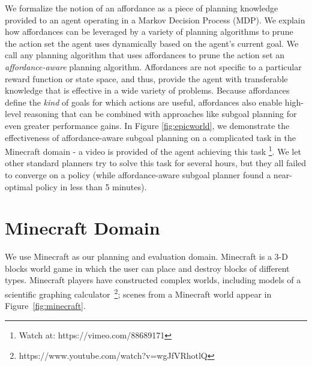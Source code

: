\documentclass[]{article}
\begin{document}
      We formalize the notion of an affordance as a piece of planning
      knowledge provided to an agent operating in a Markov Decision
      Process (MDP). We explain how affordances can be leveraged by a
      variety of planning algorithms to prune the action set the agent
      uses dynamically based on the agent's current goal.  We call any
      planning algorithm that uses affordances to prune the action set
      an {\it affordance-aware} planning algorithm.  Affordances are
      not specific to a particular reward function or state space, and thus,
      provide the agent with transferable knowledge that is effective
      in a wide variety of problems. Because affordances
      define the {\em kind} of goals for which actions are useful,
      affordances also enable high-level reasoning that can
      be combined with approaches like subgoal planning for even
      greater performance gains. In Figure \ref{fig:epicworld}, we demonstrate the effectiveness of
      affordance-aware subgoal planning on a complicated task
      in the Minecraft domain - a video is provided of the agent achieving this task \footnote{Watch at: https://vimeo.com/88689171}.
      We let other standard planners try to solve this task for several hours, but they all failed
      to converge on a policy (while affordance-aware subgoal planner found a near-optimal
      policy in less than 5 minutes).





\section{Minecraft Domain}
We use Minecraft as our planning and evaluation domain. Minecraft is a
3-D blocks world game in which the user can place and destroy blocks
of different types.  Minecraft players have constructed complex
worlds, including models of a scientific graphing
calculator~\footnote{https://www.youtube.com/watch?v=wgJfVRhotlQ};
scenes from a Minecraft world appear in Figure~\ref{fig:minecraft}.  
\end{document}
